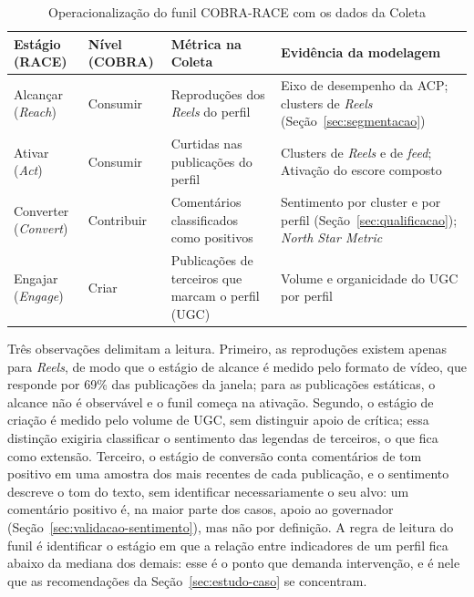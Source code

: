\begin{table}[htb]
\centering
\caption{Operacionalização do funil COBRA-RACE com os dados da Coleta}
\label{tab:funil}
\small
\begin{tabular}{p{2.3cm}p{2.3cm}p{4.6cm}p{4.6cm}}
\toprule
\textbf{Estágio (RACE)} & \textbf{Nível (COBRA)} & \textbf{Métrica na Coleta} & \textbf{Evidência da modelagem} \\
\midrule
Alcançar (\emph{Reach}) & Consumir & Reproduções dos \emph{Reels} do perfil & Eixo de desempenho da ACP; clusters de \emph{Reels} (Seção~\ref{sec:segmentacao}) \\
Ativar (\emph{Act}) & Consumir & Curtidas nas publicações do perfil & Clusters de \emph{Reels} e de \emph{feed}; Ativação do escore composto \\
Converter (\emph{Convert}) & Contribuir & Comentários classificados como positivos & Sentimento por cluster e por perfil (Seção~\ref{sec:qualificacao}); \emph{North Star Metric} \\
Engajar (\emph{Engage}) & Criar & Publicações de terceiros que marcam o perfil (UGC) & Volume e organicidade do UGC por perfil \\
\bottomrule
\end{tabular}
\end{table}

Três observações delimitam a leitura. Primeiro, as reproduções existem apenas para \emph{Reels}, de modo que o estágio de alcance é medido pelo formato de vídeo, que responde por 69\% das publicações da janela; para as publicações estáticas, o alcance não é observável e o funil começa na ativação. Segundo, o estágio de criação é medido pelo volume de UGC, sem distinguir apoio de crítica; essa distinção exigiria classificar o sentimento das legendas de terceiros, o que fica como extensão. Terceiro, o estágio de conversão conta comentários de tom positivo em uma amostra dos mais recentes de cada publicação, e o sentimento descreve o tom do texto, sem identificar necessariamente o seu alvo: um comentário positivo é, na maior parte dos casos, apoio ao governador (Seção~\ref{sec:validacao-sentimento}), mas não por definição. A regra de leitura do funil é identificar o estágio em que a relação entre indicadores de um perfil fica abaixo da mediana dos demais: esse é o ponto que demanda intervenção, e é nele que as recomendações da Seção~\ref{sec:estudo-caso} se concentram.

